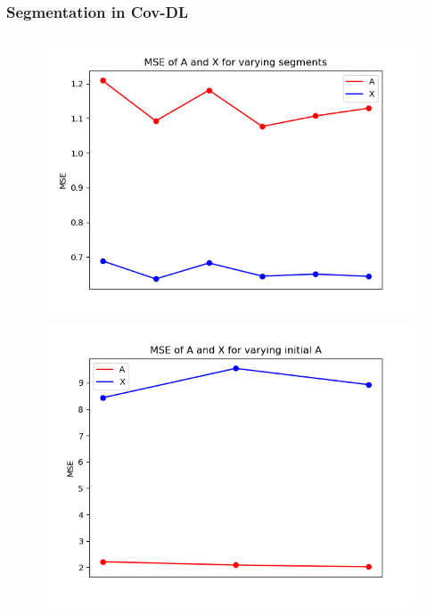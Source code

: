\subsubsection{Segmentation in Cov-DL}
\begin{figure}[H]
\centering
    \begin{minipage}[t]{.45\textwidth}
        \centering
		\includegraphics[scale=0.5]{figures/chapter6/Mix_Error_vary_covseg_m8_k16_L1000}
    \end{minipage} 
    \hfill
    \begin{minipage}[t]{.45\textwidth}
        \centering
		\includegraphics[scale=0.5]{figures/chapter6/AR_Error_initial_A_m8_k16_L1000.png}

\end{minipage}
\end{figure}
